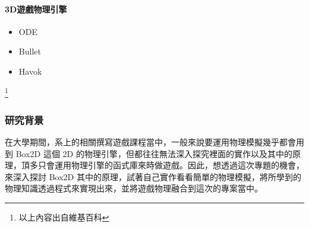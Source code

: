 \paragraph{3D遊戲物理引擎}
\begin{itemize}
    \item{ODE}        %
    \item{Bullet}
    \item{Havok}
\end{itemize}

\footnote{以上內容出自維基百科}

\subsubsection{研究背景}

在大學期間，系上的相關撰寫遊戲課程當中，一般來說要運用物理模擬幾乎都會用到 Box2D 這個 2D 的物理引擎，但都往往無法深入探究裡面的實作以及其中的原理，頂多只會運用物理引擎的函式庫來時做遊戲。因此，想透過這次專題的機會，來深入探討 Box2D 其中的原理，試著自己實作看看簡單的物理模擬，將所學到的物理知識透過程式來實現出來，並將遊戲物理融合到這次的專案當中。

